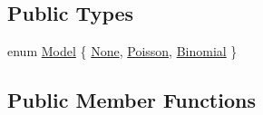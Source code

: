 \subsection*{Public Types}
\begin{DoxyCompactItemize}
\item 
enum \hyperlink{classSignalContaminatedLH_a9d4a8fe949ffa894ce3dc79a79257c39}{Model} \{ \hyperlink{classSignalContaminatedLH_a9d4a8fe949ffa894ce3dc79a79257c39a938925ccf594ff61ad6259e1cbad39ad}{None}, 
\hyperlink{classSignalContaminatedLH_a9d4a8fe949ffa894ce3dc79a79257c39acb9f8cfccc9a6e01055b7abbe18aca40}{Poisson}, 
\hyperlink{classSignalContaminatedLH_a9d4a8fe949ffa894ce3dc79a79257c39aaa0cea64560f39edb1f5cdc6fa2c8b27}{Binomial}
 \}
\end{DoxyCompactItemize}
\subsection*{Public Member Functions}
